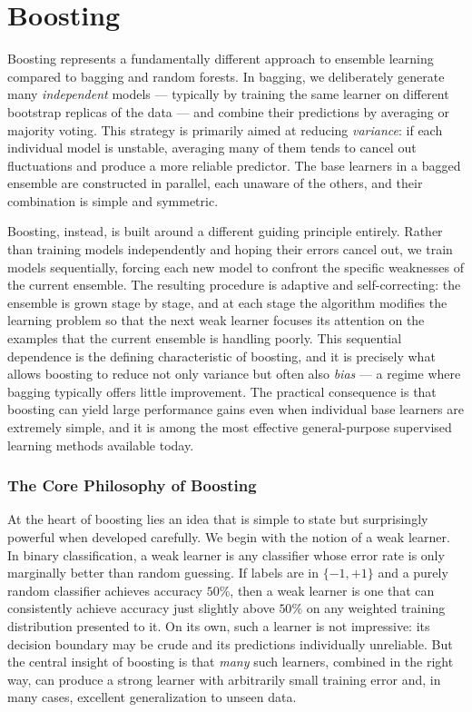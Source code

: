 \section*{Boosting}

Boosting represents a fundamentally different approach to ensemble learning compared to bagging and random forests. In bagging, we deliberately generate many \emph{independent} models --- typically by training the same learner on different bootstrap replicas of the data --- and combine their predictions by averaging or majority voting. This strategy is primarily aimed at reducing \emph{variance}: if each individual model is unstable, averaging many of them tends to cancel out fluctuations and produce a more reliable predictor. The base learners in a bagged ensemble are constructed in parallel, each unaware of the others, and their combination is simple and symmetric.

Boosting, instead, is built around a different guiding principle entirely. Rather than training models independently and hoping their errors cancel out, we train models \alert{sequentially}, forcing each new model to confront the specific weaknesses of the current ensemble. The resulting procedure is adaptive and self-correcting: the ensemble is grown stage by stage, and at each stage the algorithm modifies the learning problem so that the next weak learner focuses its attention on the examples that the current ensemble is handling poorly. This sequential dependence is the defining characteristic of boosting, and it is precisely what allows boosting to reduce not only variance but often also \emph{bias} --- a regime where bagging typically offers little improvement. The practical consequence is that boosting can yield large performance gains even when individual base learners are extremely simple, and it is among the most effective general-purpose supervised learning methods available today.

\subsubsection*{The Core Philosophy of Boosting}

At the heart of boosting lies an idea that is simple to state but surprisingly powerful when developed carefully. We begin with the notion of a \alert{weak learner}. In binary classification, a weak learner is any classifier whose error rate is only marginally better than random guessing. If labels are in $\{-1, +1\}$ and a purely random classifier achieves accuracy $50\%$, then a weak learner is one that can consistently achieve accuracy just slightly above $50\%$ on any weighted training distribution presented to it. On its own, such a learner is not impressive: its decision boundary may be crude and its predictions individually unreliable. But the central insight of boosting is that \emph{many} such learners, combined in the right way, can produce a \alert{strong learner} with arbitrarily small training error and, in many cases, excellent generalization to unseen data.


